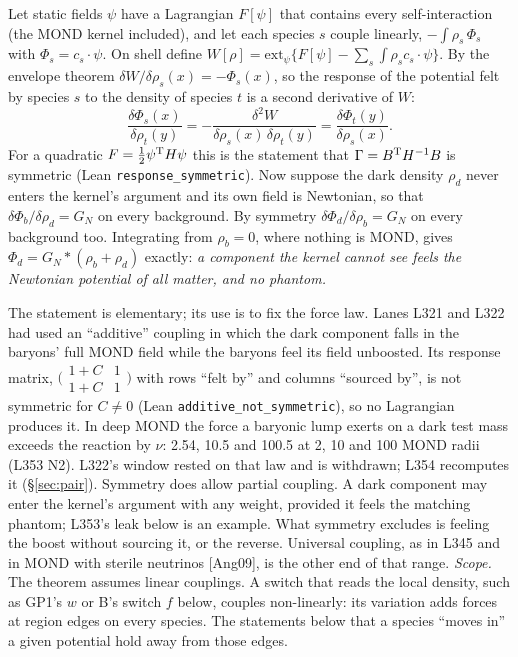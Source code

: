 \documentclass[10pt]{article}
\begin{document}
Let static fields $\psi$ have a Lagrangian $F[\psi]$ that contains every self-interaction (the MOND kernel included), and let each species $s$ couple linearly, $-\int\rho_s\,\Phi_s$ with $\Phi_s=c_s\cdot\psi$. On shell define $W[\rho]=\mathrm{ext}_\psi\{F[\psi]-\sum_s\int\rho_s c_s\cdot\psi\}$. By the envelope theorem $\delta W/\delta\rho_s(x)=-\Phi_s(x)$, so the response of the potential felt by species $s$ to the density of species $t$ is a second derivative of $W$:
\begin{equation}
\frac{\delta\Phi_s(x)}{\delta\rho_t(y)}=-\frac{\delta^2W}{\delta\rho_s(x)\,\delta\rho_t(y)}=\frac{\delta\Phi_t(y)}{\delta\rho_s(x)} .
\end{equation}
For a quadratic $F=\tfrac12\psi^{\rm T}H\psi$ this is the statement that $\Gamma=B^{\rm T}H^{-1}B$ is symmetric (Lean \texttt{response\_symmetric}).
Now suppose the dark density $\rho_d$ never enters the kernel's argument and its own field is Newtonian, so that $\delta\Phi_b/\delta\rho_d=G_N$ on every background. By symmetry $\delta\Phi_d/\delta\rho_b=G_N$ on every background too. Integrating from $\rho_b=0$, where nothing is MOND, gives $\Phi_d=G_N\ast(\rho_b+\rho_d)$ exactly: \emph{a component the kernel cannot see feels the Newtonian potential of all matter, and no phantom.}

The statement is elementary; its use is to fix the force law. Lanes L321 and L322 had used an ``additive'' coupling in which the dark component falls in the baryons' full MOND field while the baryons feel its field unboosted. Its response matrix, $\bigl(\begin{smallmatrix}1+C&1\\1+C&1\end{smallmatrix}\bigr)$ with rows ``felt by'' and columns ``sourced by'', is not symmetric for $C\neq0$ (Lean \texttt{additive\_not\_symmetric}), so no Lagrangian produces it. In deep MOND the force a baryonic lump exerts on a dark test mass exceeds the reaction by $\nu$: 2.54, 10.5 and 100.5 at 2, 10 and 100 MOND radii (L353 N2). L322's window rested on that law and is withdrawn; L354 recomputes it (\S\ref{sec:pair}).
Symmetry does allow partial coupling. A dark component may enter the kernel's argument with any weight, provided it feels the matching phantom; L353's leak below is an example. What symmetry excludes is feeling the boost without sourcing it, or the reverse. Universal coupling, as in L345 and in MOND with sterile neutrinos [Ang09], is the other end of that range.
\emph{Scope.} The theorem assumes linear couplings. A switch that reads the local density, such as GP1's $w$ or B's switch $f$ below, couples non-linearly: its variation adds forces at region edges on every species. The statements below that a species ``moves in'' a given potential hold away from those edges.
\end{document}
